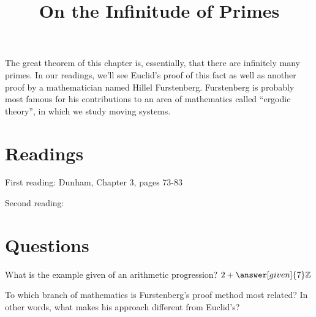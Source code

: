\documentclass[nooutcomes]{ximera}
\title{On the Infinitude of Primes}
\begin{document}
\begin{abstract}
    
\end{abstract}
\maketitle



The great theorem of this chapter is, essentially, that there are infinitely many primes.  In our readings, we'll see Euclid's proof of this fact as well as another proof by a mathematician named Hillel Furstenberg. Furstenberg is probably most famous for his contributions to an area of mathematics called ``ergodic theory'', in which we study moving systems.


\section{Readings}
First reading: Dunham, Chapter 3, pages 73-83

Second reading: 



\section{Questions}

\begin{question}
What is the example given of an arithmetic progression? $2 + \answer[given]{7} \mathbb{Z}$
\end{question}

\begin{question}
To which branch of mathematics is Furstenberg's proof method most related?  In other words, what makes his approach different from Euclid's?
\begin{multipleChoice}
\end{multipleChoice}
\end{question}


%
\end{document}
